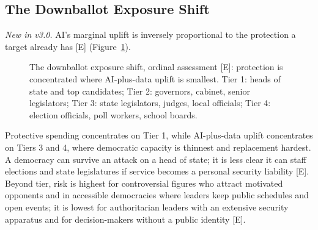 \documentclass[11pt,letterpaper]{article}
\begin{document}
\subsection{The Downballot Exposure Shift}

\textit{New in v3.0.} AI's marginal uplift is inversely proportional to the protection a target already has [E] (Figure~\ref{fig:downballot}).

\begin{figure}[!htb]
\centering
{}
\caption{The downballot exposure shift, ordinal assessment [E]: protection is concentrated where AI-plus-data uplift is smallest. Tier 1: heads of state and top candidates; Tier 2: governors, cabinet, senior legislators; Tier 3: state legislators, judges, local officials; Tier 4: election officials, poll workers, school boards.}
\label{fig:downballot}
\end{figure}

Protective spending concentrates on Tier 1, while AI-plus-data uplift concentrates on Tiers 3 and 4, where democratic capacity is thinnest and replacement hardest. A democracy can survive an attack on a head of state; it is less clear it can staff elections and state legislatures if service becomes a personal security liability [E]. Beyond tier, risk is highest for controversial figures who attract motivated opponents and in accessible democracies where leaders keep public schedules and open events; it is lowest for authoritarian leaders with an extensive security apparatus and for decision-makers without a public identity [E].
\end{document}
